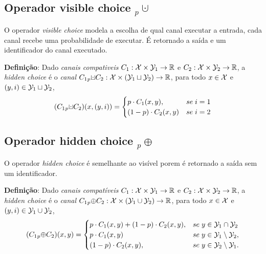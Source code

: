 \subsection*{Operador visible choice ${}_p{\cupdot}$}  
O operador \emph{visible choice} modela a escolha de qual canal executar a entrada, cada canal recebe uma probabilidade de executar. É retornado a saída e um identificador do canal executado.

\textbf{Definição}: Dado \emph{canais compativeis} $C_1:\mathcal{X}\times\mathcal{Y}_1 \rightarrow \mathbb{R}$ e $C_2:\mathcal{X}\times\mathcal{Y}_2 \rightarrow \mathbb{R}$, a \emph{hidden choice} é o \emph{canal} $C_1 {}_p{\cupdot} C_2: \calx\times (\caly_1 \sqcup \caly_2)\rightarrow\reals$, para todo $x\in\mathcal{X}$ e $(y,i)\in\mathcal{Y}_1\sqcup\mathcal{Y}_2$,
$$ (C_1 {}_p{\cupdot} C_2)(x,(y,i)) = \begin{cases}p \cdot C_1(x,y), & se \hspace{0.1cm} i=1 \\ (1-p) \cdot C_2(x,y) & se \hspace{0.1cm} i=2\end{cases} $$

\subsection*{Operador hidden choice ${}_p{\oplus}$}  
O operador \emph{hidden choice} é semelhante ao visível porem é retornado a saída sem um identificador.

\textbf{Definição}: Dado \emph{canais compatíveis} $C_1:\mathcal{X}\times\mathcal{Y}_1 \rightarrow \mathbb{R}$ e $C_2:\mathcal{X}\times\mathcal{Y}_2 \rightarrow \mathbb{R}$, a \emph{hidden choice} é o \emph{canal} $C_1 {}_p{\oplus} C_2: \mathcal{X}\times (\mathcal{Y}_1 \cup \mathcal{Y}_2)\rightarrow\mathbb{R}$, para todo $x\in\mathcal{X}$ e $(y,i)\in\mathcal{Y}_1\cup\mathcal{Y}_2$,
$$ (C_1 {}_p{\oplus} C_2)(x,y) = \begin{cases}p \cdot C_1(x,y) + (1-p) \cdot C_2(x,y), & se \hspace{0.1cm} y \in \mathcal{Y}_1 \cap \mathcal{Y}_2 \\ p \cdot C_1(x,y) & se \hspace{0.1cm} y\in\mathcal{Y}_1 \setminus \mathcal{Y}_2, \\ (1-p) \cdot C_2(x,y), & se \hspace{0.1cm} y\in\mathcal{Y}_2 \setminus \mathcal{Y}_1.\end{cases} $$

